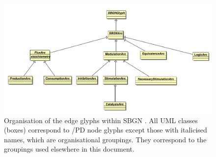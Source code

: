 \begin{figure}[htb!]
\begin{center}
\includegraphics[width=\linewidth]{images/sbgn_edge_taxonomy}
\caption{Organisation of the edge glyphs within SBGN \PDl. All UML classes (boxes) correspond to /PD node glyphs except those with italicised names, which are organisational groupings. They correspond to the groupings used elsewhere in this document.}
\label{fig:sbgn_edge_tax}
\end{center}
\end{figure}


